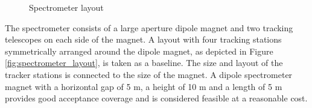 	\begin{figure}[h!]
		\centering
		\qquad
		\caption{Spectrometer layout}
	\end{figure}

	
	The spectrometer consists of a large aperture dipole magnet and two tracking telescopes on each side of the magnet. A layout with four tracking stations
symmetrically arranged around the dipole magnet, as depicted in Figure \ref{fig:spectrometer_layout}, is taken as a baseline. The size and layout of the tracker stations is connected to the size of the magnet. A dipole spectrometer magnet with a horizontal gap of 5 m, a height of 10 m and a length of 5 m provides good acceptance coverage and is considered feasible at a reasonable cost.


